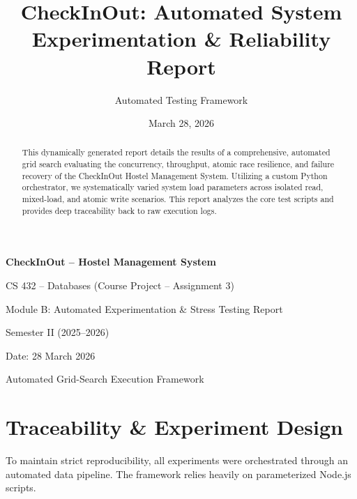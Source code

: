 \documentclass[sigconf]{acmart}
\title{CheckInOut: Automated System Experimentation \& Reliability Report}
\author{Automated Testing Framework}
\affiliation{%
  \institution{Indian Institute of Technology Gandhinagar}
  \city{Gandhinagar}
  \country{India}
}
\date{March 28, 2026}
\begin{document}
\begin{titlepage}
    \centering
    \vspace*{2cm}
    {\Huge\bfseries CheckInOut -- Hostel Management System\par}
    \vspace{1cm}
    {\Large CS 432 -- Databases (Course Project -- Assignment 3)\par}
    \vspace{0.5cm}
    {\large Module B: Automated Experimentation \& Stress Testing Report\par}
    \vspace{1.5cm}
    {\large Semester II (2025--2026)\par}
    \vspace{0.5cm}
    {\large Date: 28 March 2026\par}
    \vfill
    {\large Automated Grid-Search Execution Framework\par}
\end{titlepage}

\setcounter{page}{1}

\begin{abstract}
This dynamically generated report details the results of a comprehensive, automated grid search evaluating the concurrency, throughput, atomic race resilience, and failure recovery of the CheckInOut Hostel Management System. Utilizing a custom Python orchestrator, we systematically varied system load parameters across isolated read, mixed-load, and atomic write scenarios. This report analyzes the core test scripts and provides deep traceability back to raw execution logs.
\end{abstract}

\maketitle

\section{Traceability \& Experiment Design}
To maintain strict reproducibility, all experiments were orchestrated through an automated data pipeline. The framework relies heavily on parameterized Node.js scripts.
\end{document}
